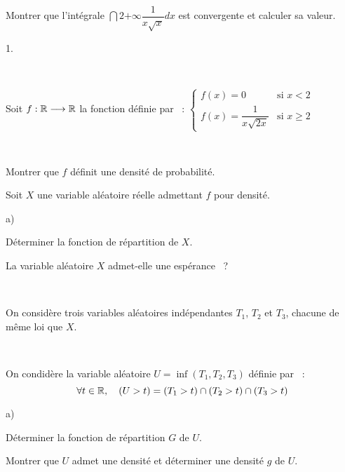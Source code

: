 \documentclass[11pt]{article}%
\begin{document}
\begin{center}
\vspace{1.5cm}{\LARG\E\ \noindent EXERCICE~3}
\end{center}

Montrer que l'intégrale $ \dint{2}{+ \infty }\dfrac{1}{x\sqrt{x}}dx$
est convergente et calculer sa valeur.

\begin{noliste}{1.}
 \setlength{\itemsep}{4mm}
\item ~

Soit $f :\Bbb{R}\longrightarrow \Bbb{R}$ la fonction définie par~ :
$\left\{ 
\begin{array}{cc}
f\left( {x}\right) = 0 & \text{si }x<2 \\
f\left( {x}\right) = \dfrac{1}{x\sqrt{2x}} & \text{si }x\geq 2
\end{array}
\right. $

~

\item Montrer que $f$ définit une densité de probabilité.

\item Soit $X$ une variable aléatoire réelle admettant $f$ pour
densité.

\begin{noliste}{a)}
 \setlength{\itemsep}{2mm}
\item Déterminer la fonction de répartition de $X$.

\item La variable aléatoire $X$ admet-elle une espérance~ ?
\end{noliste}

~

On considère trois variables aléatoires indépendantes $T_{1}$, $T_{2}$
et $T_{3}$, chacune de même loi que $X$.

~

\item On condidère la variable aléatoire $U = \inf \left(
{T_{1},T_{2},T_{3}}\right) $ définie par~ : 
\[
\forall t\in \Bbb{R},\quad \left( {U>t}\right) = \left(
{T_{1}>t}\right)
\cap \left( {T_{2}>t}\right) \cap \left( {T_{3}>t}\right) 
\]

\begin{noliste}{a)}
 \setlength{\itemsep}{2mm}
\item Déterminer la fonction de répartition $G$ de $U$.

\item Montrer que $U$ admet une densité et déterminer une
densité $g$ de $U$.


\end{noliste}
\end{noliste}
\end{document}
